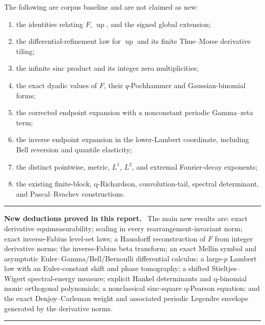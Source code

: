 \documentclass[11pt,oneside]{article}
\numberwithin{equation}{section}
\theoremstyle{plain}
\theoremstyle{definition}
\theoremstyle{remark}
\newcommand{\Up}{\operatorname{up}}
\newenvironment{resultbox}[1]{%
  \par\medskip\noindent\begin{minipage}{\textwidth}%
  \color{DeepGreen}\hrule\vspace{5pt}%
  \color{black}\textbf{\color{DeepGreen}#1.}\ }{%
  \par\vspace{5pt}\color{DeepGreen}\hrule
  \end{minipage}\par\medskip}
\begin{document}
The following are corpus baseline and are not claimed as new:
\begin{enumerate}[label=(\roman*)]
\item the identities relating $F$, $\Up$, and the signed global extension;
\item the differential-refinement law for $\Up$ and its finite Thue--Morse derivative tiling;
\item the infinite sinc product and its integer zero multiplicities;
\item the exact dyadic values of $F$, their $q$-Pochhammer and Gaussian-binomial forms;
\item the corrected endpoint expansion with a nonconstant periodic Gamma--zeta term;
\item the inverse endpoint expansion in the lower-Lambert coordinate, including Bell
      reversion and quantile elasticity;
\item the distinct pointwise, metric, $L^1$, $L^2$, and extremal Fourier-decay exponents;
\item the existing finite-block, q-Richardson, convolution-tail, spectral determinant,
      and Pascal--Rvachev constructions.
\end{enumerate}

\begin{resultbox}{New deductions proved in this report}
The main new results are: exact derivative equimeasurability; scaling in every
rearrangement-invariant norm; exact inverse-Fabius level-set laws; a Hausdorff reconstruction
of $F$ from integer derivative norms; the inverse-Fabius beta transform; an exact Mellin
symbol and asymptotic Euler--Gamma/Bell/Bernoulli differential calculus; a large-$p$
Lambert law with an Euler-constant shift and phase tomography; a shifted
Stieltjes--Wigert spectral-energy measure; explicit Hankel determinants and q-binomial monic
orthogonal polynomials; a nonclassical sinc-square q-Pearson equation; and the exact
Denjoy--Carleman weight and associated periodic Legendre envelope generated by the derivative
norms.
\end{resultbox}
\end{document}
